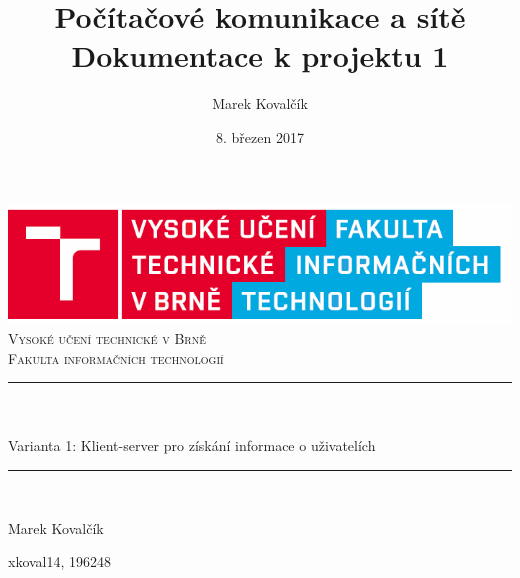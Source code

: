 \documentclass[11pt]{article}
\title{Počítačové komunikace a sítě\\[0.5 cm] Dokumentace k projektu 1}
\author{Marek Kovalčík}
\date{8. březen 2017}
\makeatletter
\let\thetitle\@title
\let\thedate\@date
\makeatother
\begin{document}
	
	
	\begin{titlepage}
		\centering
		\vspace*{0.5 cm}
		\includegraphics[scale = 0.3]{logo.png}\\[2.0 cm]
		\textsc{\LARGE Vysoké učení technické v Brně}\\[0.3 cm]
		\textsc{\Large Fakulta informačních technologií}\\[2.0 cm]
		\rule{\linewidth}{0.2 mm} \\[2.0 cm]
		{ \huge \bfseries \thetitle}\\[2.0 cm]
		\LARGE{Varianta 1: Klient-server pro získání informace o uživatelích}\\[0.5 cm]
		\rule{\linewidth}{0.2 mm} \\[2.0 cm]
		
		\begin{minipage}{0.4\textwidth}
			\begin{flushleft} \large
				\vspace{1 cm}
				Marek Kovalčík
			\end{flushleft}
		\end{minipage}
		\begin{minipage}{0.4\textwidth}
			\begin{flushright} \large
				\vspace{1 cm}
				xkoval14, 196248 \hspace{1 cm}\\								
			\end{flushright}
		\end{minipage}\\[2 cm]
		
		{\large \thedate}\\[2 cm]
		
		\vfill
		
	\end{titlepage}
	\newpage
	\tableofcontents
	\clearpage
	
	
	
\end{document}
